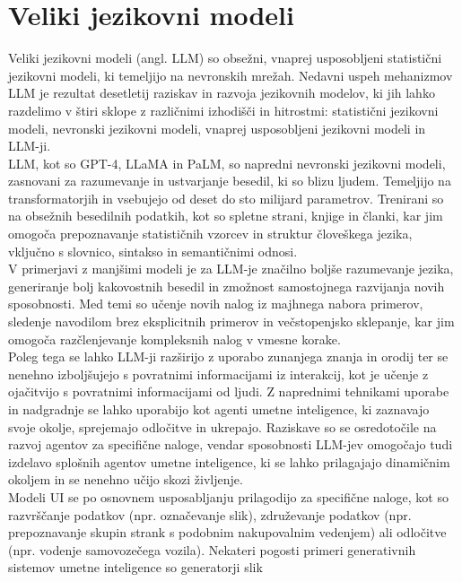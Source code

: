 \documentclass[a4paper,12pt,openright]{book}
\begin{document}
\section{Veliki jezikovni modeli}
Veliki jezikovni modeli (angl. LLM) so obsežni, vnaprej usposobljeni statistični jezikovni modeli, ki temeljijo na nevronskih mrežah. Nedavni uspeh mehanizmov LLM je rezultat desetletij raziskav in razvoja jezikovnih modelov, ki jih lahko razdelimo v štiri sklope z različnimi izhodišči in hitrostmi: statistični jezikovni modeli, nevronski jezikovni modeli, vnaprej usposobljeni jezikovni modeli in LLM-ji.\cite{minaee2024largelanguagemodelssurvey} \\
LLM, kot so GPT-4, LLaMA in PaLM, so napredni nevronski jezikovni modeli, zasnovani za razumevanje in ustvarjanje besedil, ki so blizu ljudem. Temeljijo na transformatorjih in vsebujejo od deset do sto milijard parametrov. Trenirani so na obsežnih besedilnih podatkih, kot so spletne strani, knjige in članki, kar jim omogoča prepoznavanje statističnih vzorcev in struktur človeškega jezika, vključno s slovnico, sintakso in semantičnimi odnosi.\cite{10.1145/3520312.3534862} \\
V primerjavi z manjšimi modeli je za LLM-je značilno boljše razumevanje jezika, generiranje bolj kakovostnih besedil in zmožnost samostojnega razvijanja novih sposobnosti. Med temi so učenje novih nalog iz majhnega nabora primerov, sledenje navodilom brez eksplicitnih primerov in večstopenjsko sklepanje, kar jim omogoča razčlenjevanje kompleksnih nalog v vmesne korake. \cite{minaee2024largelanguagemodelssurvey} \\
Poleg tega se lahko LLM-ji razširijo z uporabo zunanjega znanja in orodij ter se nenehno izboljšujejo s povratnimi informacijami iz interakcij, kot je učenje z ojačitvijo s povratnimi informacijami od ljudi. Z naprednimi tehnikami uporabe in nadgradnje se lahko uporabijo kot agenti umetne inteligence, ki zaznavajo svoje okolje, sprejemajo odločitve in ukrepajo. Raziskave so se osredotočile na razvoj agentov za specifične naloge, vendar sposobnosti LLM-jev omogočajo tudi izdelavo splošnih agentov umetne inteligence, ki se lahko prilagajajo dinamičnim okoljem in se nenehno učijo skozi življenje.
\cite{minaee2024largelanguagemodelssurvey} \\
Modeli UI se po osnovnem usposabljanju prilagodijo za specifične naloge, kot so razvrščanje podatkov (npr. označevanje slik), združevanje podatkov (npr. prepoznavanje skupin strank s podobnim nakupovalnim vedenjem) ali
odločitve (npr. vodenje samovozečega vozila). Nekateri pogosti primeri generativnih sistemov umetne inteligence so generatorji slik
\end{document}

